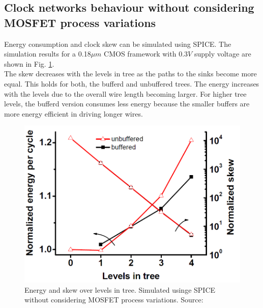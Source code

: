 \documentclass[conference]{IEEEtran}
\begin{document}
\subsection{Clock networks behaviour without considering MOSFET process variations}
Energy consumption and clock skew can be simulated using SPICE. The simulation results for a 0.18$\mu m$ CMOS framework with 0.3$V$ supply voltage are shown in Fig. \ref{fig:skew_energy_normal}.\\
The skew decreases with the levels in tree as the paths to the sinks become more equal. This holds for both, the bufferd and unbuffered trees. The energy increases with the levels due to the overall wire length becoming larger. For higher tree levels, the bufferd version consumes less energy because the smaller buffers are more energy efficient in driving longer wires.

\begin{figure}[htbp]
	\includegraphics[width=0.8\linewidth]{img/skew_energy_normal.png}
	\centering
	\caption{Energy and skew over levels in tree. Simulated usinge SPICE without considering MOSFET process variations. Source: \cite{b1}}
	\label{fig:skew_energy_normal}
\end{figure}
\end{document}
